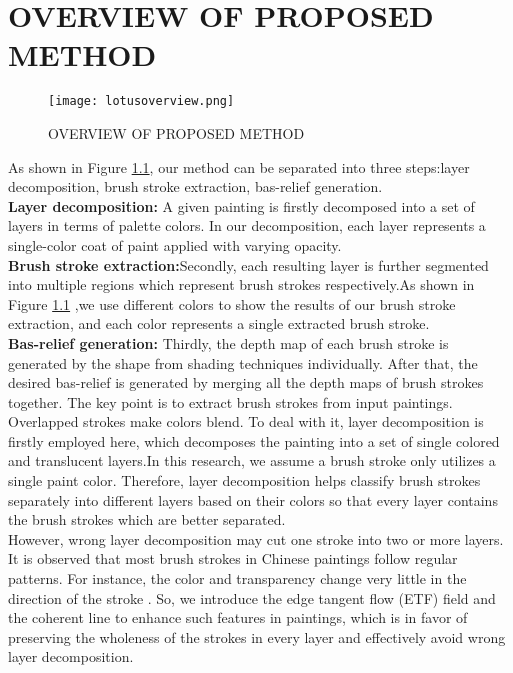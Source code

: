 \chapter{OVERVIEW OF PROPOSED METHOD} \label{overview}

\begin{figure}
\centering
\texttt{[image: lotusoverview.png]}
\caption{ OVERVIEW OF PROPOSED METHOD}
\label{decom:overview}
\end{figure}
As shown in Figure \ref{decom:overview}, our method can be separated into three steps:layer decomposition, brush stroke extraction, bas-relief generation. \\
\textbf{Layer decomposition:} A given painting is firstly decomposed into a set of layers in terms of palette colors. In our decomposition, each layer represents a single-color coat of paint applied with varying opacity.\\ \textbf{Brush stroke extraction:}Secondly, each resulting layer is further segmented into multiple regions which represent brush strokes respectively.As shown in Figure \ref{decom:overview} ,we use different colors to show the results of our brush stroke extraction, and each color represents a single extracted brush stroke. \\
\textbf{Bas-relief generation:} Thirdly, the depth map of each brush stroke is generated by the shape from shading techniques individually. After that, the desired bas-relief is generated by merging all the depth maps of brush strokes together.
\newline
The key point is to extract brush strokes from input paintings. Overlapped strokes make colors blend. To deal with it, layer decomposition is firstly employed here, which decomposes the painting into a set of single colored and translucent layers.In this research, we assume a brush stroke only utilizes a single paint color. Therefore, layer decomposition helps classify brush strokes separately into different layers based on their colors so that every layer contains the brush strokes which are better separated.\\
However, wrong layer decomposition may cut one stroke into two or more layers. It is observed that most brush strokes in Chinese paintings follow regular patterns. For instance, the color and transparency change very little in the direction of the stroke \cite{xu2006animating}. So, we introduce the edge tangent flow (ETF) field and the coherent line \cite{kang2007coherent} to enhance such features in paintings, which is in favor of preserving the wholeness of the strokes in every layer and effectively avoid wrong layer decomposition.

